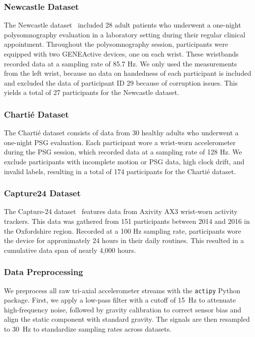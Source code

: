 \documentclass[journal,twoside,web]{ieeecolor}
\begin{document}
\subsubsection{Newcastle Dataset}
The Newcastle dataset~\cite{vanhees_newcastle_2018} included 28 adult patients who underwent a one-night polysomnography evaluation in a laboratory setting during their regular clinical appointment. Throughout the polysomnography session, participants were equipped with two GENEActive devices, one on each wrist. These wristbands recorded data at a sampling rate of 85.7 Hz. We only used the measurements from the left wrist, because no data on handedness of each participant is included and excluded the data of participant ID 29 because of corruption issues. This yields a total of 27 participants for the Newcastle dataset.
\subsubsection{Chartié Dataset}
The Chartié dataset consists of data from 30 healthy adults who underwent a one-night PSG evaluation. Each participant wore a wrist-worn accelerometer during the PSG session, which recorded data at a sampling rate of 128 Hz. We exclude participants with incomplete motion or PSG data, high clock drift, and invalid labels, resulting in a total of 174 participants for the Chartié dataset.
\subsubsection{Capture24 Dataset}
The Capture-24 dataset~\cite{chan2021capture} features data from Axivity AX3 wrist-worn activity trackers. This data was gathered from 151 participants between 2014 and 2016 in the Oxfordshire region. Recorded at a 100 Hz sampling rate, participants wore the device for approximately 24 hours in their daily routines. This resulted in a cumulative data span of nearly 4,000 hours.
\subsubsection{Data Preprocessing}

We preprocess all raw tri-axial accelerometer streams with the \texttt{actipy} Python package. First, we apply a low-pass filter with a cutoff of 15~Hz to attenuate high-frequency noise, followed by gravity calibration to correct sensor bias and align the static component with standard gravity. The signals are then resampled to 30~Hz to standardize sampling rates across datasets.
\end{document}
